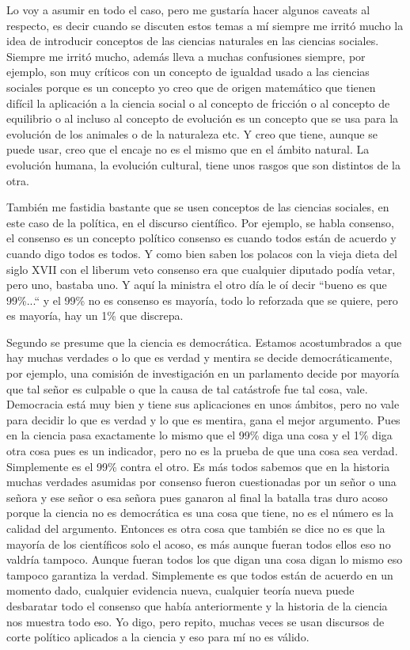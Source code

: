 Lo voy a asumir en todo el caso, pero me gustaría hacer algunos caveats al respecto, es decir cuando se discuten estos temas a mí siempre me irritó mucho la idea de introducir conceptos de las ciencias naturales en las ciencias sociales. Siempre me irritó mucho, además lleva a muchas confusiones siempre, por ejemplo, son muy críticos con un concepto de igualdad usado a las ciencias sociales porque es un concepto yo creo que de origen matemático que tienen difícil la aplicación a la ciencia social o al concepto de fricción o al concepto de equilibrio o al incluso al concepto de evolución es un concepto que se usa para la evolución de los animales o de la naturaleza etc. Y creo que tiene, aunque se puede usar, creo que el encaje no es el mismo que en el ámbito natural. La evolución humana, la evolución cultural, tiene unos rasgos que son distintos de la otra.

También me fastidia bastante que se usen conceptos de las ciencias sociales, en este caso de la política, en el discurso científico. Por ejemplo, se habla consenso, el consenso es un concepto político consenso es cuando todos están de acuerdo y cuando digo todos es todos. Y como bien saben los polacos con la vieja dieta del siglo XVII con el liberum veto consenso era que cualquier diputado podía vetar, pero uno, bastaba uno. Y aquí la ministra el otro día le oí decir ``bueno es que 99\%...`` y el 99\% no es consenso es mayoría, todo lo reforzada que se quiere, pero es mayoría, hay un 1\% que discrepa.

Segundo se presume que la ciencia es democrática. Estamos acostumbrados a que hay muchas verdades o lo que es verdad y mentira se decide democráticamente, por ejemplo, una comisión de investigación en un parlamento decide por mayoría que tal señor es culpable o que la causa de tal catástrofe fue tal cosa, vale. Democracia está muy bien y tiene sus aplicaciones en unos ámbitos, pero no vale para decidir lo que es verdad y lo que es mentira, gana el mejor argumento. Pues en la ciencia pasa exactamente lo mismo que el 99\% diga una cosa y el 1\% diga otra cosa pues es un indicador, pero no es la prueba de que una cosa sea verdad. Simplemente es el 99\% contra el otro. Es más todos sabemos que en la historia muchas verdades asumidas por consenso fueron cuestionadas por un señor o una señora y ese señor o esa señora pues ganaron al final la batalla tras duro acoso porque la ciencia no es democrática es una cosa que tiene, no es el número es la calidad del argumento. Entonces es otra cosa que también se dice no es que la mayoría de los científicos solo el acoso, es más aunque fueran todos ellos eso no valdría tampoco. Aunque fueran todos los que digan una cosa digan lo mismo eso tampoco garantiza la verdad. Simplemente es que todos están de acuerdo en un momento dado, cualquier evidencia nueva, cualquier teoría nueva puede desbaratar todo el consenso que había anteriormente y la historia de la ciencia nos muestra todo eso. Yo digo, pero repito, muchas veces se usan discursos de corte político aplicados a la ciencia y eso para mí no es válido.

